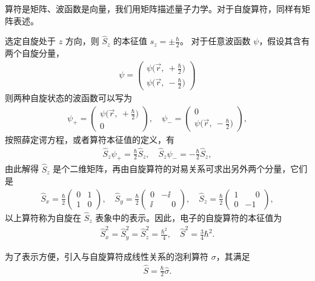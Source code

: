 {%
算符是矩阵、波函数是向量，我们用矩阵描述量子力学。对于自旋算符，同样有矩阵表述。

选定自旋处于 $z$ 方向，则 $\hat S_z$ 的本征值 $s_z=\pm\frac\hbar2$。
对于任意波函数 $\psi$，假设其含有两个自旋分量，
\begin{align}
    \psi = \begin{pmatrix}
        \psi\bigl(\vec r, \ +\frac\hbar2\bigr) \\
        \psi\bigl(\vec r, \ - \frac\hbar2\bigr) 
    \end{pmatrix}
\end{align}
则两种自旋状态的波函数可以写为
\begin{align}
\psi_+ = \begin{pmatrix}
    \psi\bigl(\vec r, \ +\frac\hbar2\bigr) \\
    0 
\end{pmatrix}, \quad 
\psi_- = \begin{pmatrix}
    0 \\
    \psi\bigl(\vec r, \ - \frac\hbar2\bigr) 
\end{pmatrix},
\end{align}
按照薛定谔方程，或者算符本征值的定义，有
\begin{align}
\hat S_z \psi_+ = \frac\hbar2 \hat S_z, \quad 
\hat S_z \psi_- = -\frac\hbar2 \hat S_z, 
\end{align}
由此解得 $\hat S_z$ 是个二维矩阵，再由自旋算符的对易关系可求出另外两个分量，它们是
\begin{align}
\hat S_x = \frac\hbar2 \begin{pmatrix}
    0 & 1 \\ 1 & 0
\end{pmatrix}, \quad 
\hat S_y = \frac\hbar2 \begin{pmatrix}
    0 & -\ii \\ \ii & \phantom{-}0
\end{pmatrix}, \quad 
\hat S_z = \frac\hbar2 \begin{pmatrix}
    1 & \phantom{-}0 \\ 0 & -1
\end{pmatrix},
\end{align}
以上算符称为自旋在 $\hat S_z$ 表象中的表示。因此，电子的自旋算符的本征值为
\begin{align}
    \hat S_x^2 = \hat S_y^2 = \hat S_z^2 = \frac{\hbar^2}{4}, \quad \hat S^2 = \frac34 \hbar^2. 
\end{align}

为了表示方便，引入与自旋算符成线性关系的泡利算符 $\sigma$，其满足
\begin{align}
    \hat S = \frac \hbar 2 \hat \sigma . 
\end{align}
}

